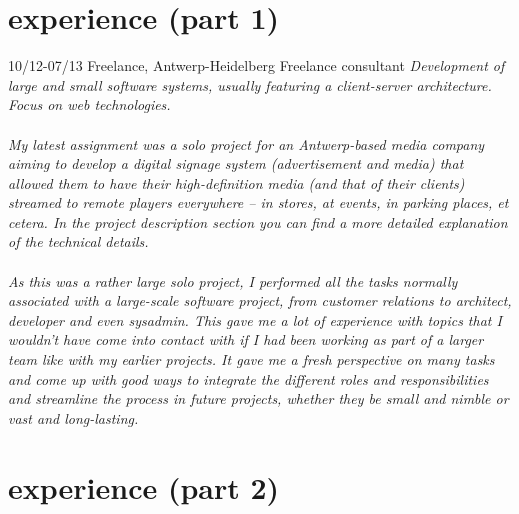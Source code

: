 \documentclass[]{friggeri-cv}
\begin{document}
\section{experience (part 1)}

\begin{entrylist}
  \entry
    {10/12-07/13}
    {Freelance, Antwerp-Heidelberg}
    {Freelance consultant}
    {\emph{Development of large and small software systems, usually featuring a client-server architecture. Focus on web technologies. \\\\ My latest assignment was a solo project for an Antwerp-based media company aiming to develop a digital signage system (advertisement and media) that allowed them to have their high-definition media (and that of their clients) streamed to remote players everywhere -- in stores, at events, in parking places, et cetera. In the project description section you can find a more detailed explanation of the technical details. \\\\ As this was a rather large solo project, I performed all the tasks normally associated with a large-scale software project, from customer relations to architect, developer and even sysadmin. This gave me a lot of experience with topics that I wouldn't have come into contact with if I had been working as part of a larger team like with my earlier projects. It gave me a fresh perspective on many tasks and come up with good ways to integrate the different roles and responsibilities and streamline the process in future projects, whether they be small and nimble or vast and long-lasting.
    }}
\end{entrylist}

\clearpage

\section{experience (part 2)}
\end{document}
